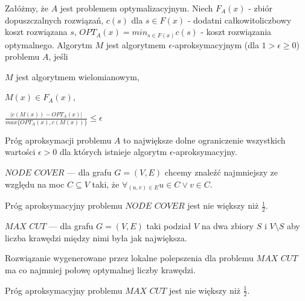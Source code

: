 \begin{definicja}
    Załóżmy, że $A$ jest problemem optymalizacyjnym. Niech $F_A(x)$ - zbiór dopuszczalnych rozwiązań, $c(s)$ dla $s \in F(x)$ - dodatni całkowitoliczbowy koszt rozwiązana $s$, $OPT_A(x) = min_{s \in F(x)} c(s)$ - koszt rozwiązania optymalnego. Algorytm $M$ jest algorytmem $\epsilon$-aproksymacyjnym (dla $1 > \epsilon \geq 0$) problemu $A$, jeśli 
    \begin{enumerate*}[label=\roman*)]
        \item $M$ jest algorytmem wielomianowym,
        \item $M(x) \in F_A(x)$,
        \item $\frac{|c(M(x)) - OPT_A(x)|}{max\{OPT_A(x), c(M(x))\}} \leq \epsilon$
    \end{enumerate*}
\end{definicja}

\begin{definicja}
    Próg aproksymacji problemu $A$ to największe dolne ograniczenie wszystkich wartości $\epsilon > 0$ dla których istnieje algorytm $\epsilon$-aproksymacyjny.
\end{definicja}

\begin{definicja}
    $NODE$ $COVER$ --- dla grafu $G = (V,E)$ chcemy znaleźć najmniejszy ze względu na moc $C \subseteq V$ taki, że $\forall_{(u,v) \in E} u \in C \lor v \in C$.
\end{definicja}

\begin{twierdzenie}
    Próg aproksymacyjny problemu $NODE$ $COVER$ jest nie większy niż $\frac{1}{2}$. 
\end{twierdzenie}

\begin{definicja}
    $MAX$ $CUT$ --- dla grafu $G = (V,E)$ taki podział $V$ na dwa zbiory $S$ i $V \setminus S$ aby liczba krawędzi między nimi była jak największa.
\end{definicja}

\begin{lemat}
    Rozwiązanie wygenerowane przez lokalne polepszenia dla problemu $MAX$ $CUT$ ma co najmniej połowę optymalnej liczby krawędzi.
\end{lemat}

\begin{twierdzenie}
    Próg aproksymacyjny problemu $MAX$ $CUT$ jest nie większy niż $\frac{1}{2}$. 
\end{twierdzenie}

